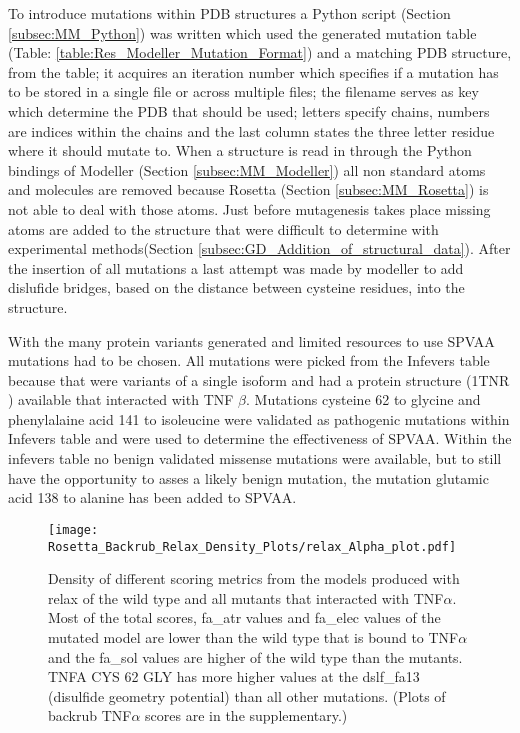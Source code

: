 	\newpage
	To introduce mutations within PDB structures a Python script (Section \ref{subsec:MM_Python}) was written which used the generated mutation table (Table: \ref{table:Res_Modeller_Mutation_Format}) and a matching PDB structure, from the table; it acquires an iteration number which specifies if a mutation has to be stored in a single file or across multiple files; the filename serves as key which determine the PDB that should be used; letters specify chains, numbers are indices within the chains and the last column states the three letter residue where it should mutate to. When a structure is read in through the Python bindings of Modeller (Section \ref{subsec:MM_Modeller}) all non standard atoms and molecules are removed because Rosetta (Section \ref{subsec:MM_Rosetta}) is not able to deal with those atoms. Just before mutagenesis takes place missing atoms are added to the structure that were difficult to determine with experimental methods(Section \ref{subsec:GD_Addition_of_structural_data}). After the insertion of all mutations a last attempt was made by modeller to add dislufide bridges, based on the distance between cysteine residues, into the structure.
	
	With the many protein variants generated and limited resources to use SPVAA mutations had to be chosen. All mutations were picked from the Infevers table because that were variants of a single isoform and had a protein structure (1TNR \cite{}) available that interacted with TNF $\beta$. 
	Mutations cysteine 62 to glycine and phenylalaine acid 141 to isoleucine were validated as pathogenic mutations within Infevers table and were used to determine the effectiveness of SPVAA. Within the infevers table no benign validated missense mutations were available, but to still have the opportunity to asses a likely benign mutation, the mutation glutamic acid 138 to alanine has been added to SPVAA.	
	
	\newpage
	\begin{figure}[!ht]
		\centering
		\texttt{[image: Rosetta\_Backrub\_Relax\_Density\_Plots/relax\_Alpha\_plot.pdf]}
		\caption[TNFRSF1A homotimer with TNF$\alpha$ homotrimer relax score density plots]{Density of different scoring metrics from the models produced with relax of the wild type and all mutants that interacted with TNF$\alpha$. Most of the total scores, fa\_atr values and fa\_elec values of the mutated model are lower than the wild type that is bound to TNF$\alpha$ and the fa\_sol values are higher of the wild type than the mutants. TNFA CYS 62 GLY has more higher values at the dslf\_fa13 (disulfide geometry potential) than all other mutations. (Plots of backrub TNF$\alpha$ scores are in the supplementary.)}
		\label{fig:relax_TNFA_scores}
	\end{figure}

